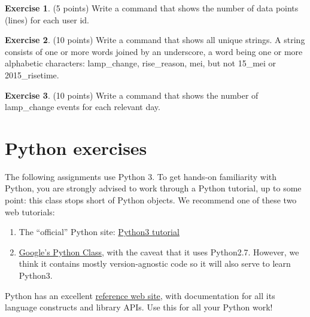 \documentclass[11pt]{article}
\theoremstyle{definition}
\newtheorem{exercise}{Exercise}
\begin{document}
\begin{exercise}
	(5 points) Write a command that shows the number of data points (lines) for each
	user id.
\end{exercise}

\begin{exercise}
	(10 points) Write a command that shows all unique strings. A string consists of one or more words joined by an underscore, a word being
	one or more alphabetic characters: lamp\_change, rise\_reason, mei, but not 15\_mei or 2015\_risetime.
\end{exercise}

\begin{exercise}
	(10 points) Write a command that shows the number of lamp\_change events for each relevant day.
\end{exercise}


\section*{Python exercises}
\label{python-exercises}
The following assignments use Python 3. To get hands-on familiarity with Python, you are strongly advised to work through a Python tutorial, up to some point: this class stops short of Python objects. We recommend one of these two web tutorials:
\begin{enumerate}
	\setlength\itemsep{1mm}
	\item The ``official'' Python site: \href{https://docs.python.org/3/tutorial}{Python3 tutorial}
	\item \href{https://developers.google.com/edu/python/}{Google's Python Class}, with the caveat that it uses Python2.7. However, we think it contains	mostly version-agnostic code so it will also serve to learn Python3.
\end{enumerate}

\noindent Python has an excellent \href{https://docs.python.org/3/}{reference web site}, with documentation for all its language
constructs and library APIs. Use this for all your Python work!
\end{document}
